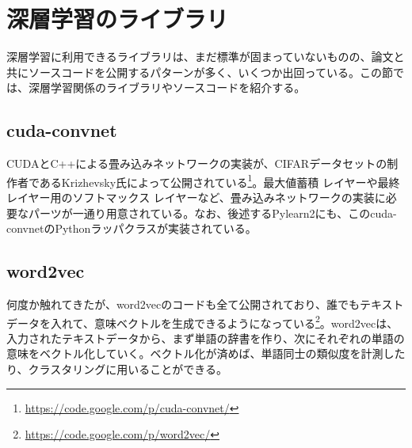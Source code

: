 \section{深層学習のライブラリ}
深層学習に利用できるライブラリは、まだ標準が固まっていないものの、論文と共にソースコードを公開するパターンが多く、いくつか出回っている。この節では、深層学習関係のライブラリやソースコードを紹介する。

\subsection{cuda-convnet}
CUDAとC++による畳み込みネットワークの実装が、CIFARデータセットの制作者であるKrizhevsky氏によって公開されている\footnote{\url{https://code.google.com/p/cuda-convnet/}}。最大値蓄積 レイヤーや最終レイヤー用のソフトマックス レイヤーなど、畳み込みネットワークの実装に必要なパーツが一通り用意されている。なお、後述するPylearn2にも、このcuda-convnetのPythonラッパクラスが実装されている。

\subsection{word2vec}
何度か触れてきたが、word2vecのコードも全て公開されており、誰でもテキストデータを入れて、意味ベクトルを生成できるようになっている\footnote{\url{https://code.google.com/p/word2vec/}}。word2vecは、入力されたテキストデータから、まず単語の辞書を作り、次にそれぞれの単語の意味をベクトル化していく。ベクトル化が済めば、単語同士の類似度を計測したり、クラスタリングに用いることができる。


